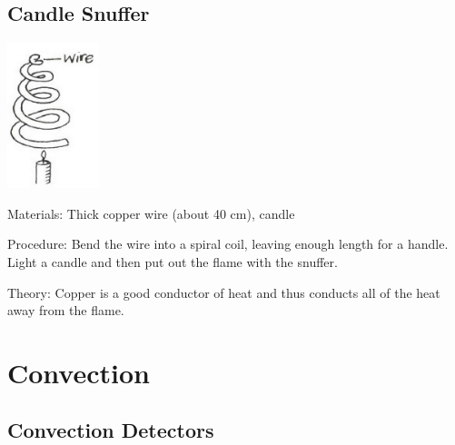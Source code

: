 \begin{multicols}{2}
\subsection{Candle Snuffer}

\begin{center}
\includegraphics[width=0.2\textwidth]{./img/vso/candle-snuffer.jpg}
\end{center}

\begin{description*}
\item[Materials:]{Thick copper wire (about 40 cm), candle}
\item[Procedure:]{Bend the wire into a spiral coil, leaving enough length for a handle. Light a candle and then put out the flame with the snuffer.}
\item[Theory:]{Copper is a good conductor of heat and thus conducts all of the heat away from the flame.}
\end{description*}


\section*{Convection} 


\subsection{Convection Detectors}


\end{multicols}
